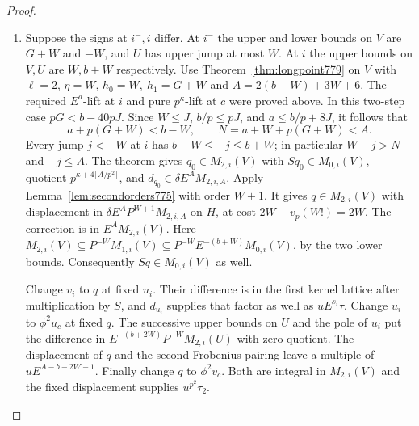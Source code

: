 \documentclass[a4paper,11pt]{article}
\theoremstyle{definition}
\theoremstyle{remark}
\numberwithin{equation}{section}
\begin{document}
\begin{proof}
\begin{enumerate}
First change \(u_i\) to \(q\) at fixed \(v_i\). The two
points are in \(S^{-1}M_{0,i}(U)\), and the first pairing
leaves a multiple of \(uE^{D-W-s_i}\). At fixed \(q\)
change \(v_i\) to \(\phi^2 v_c\). The difference is in
\(E^{-2W}P^{-W}M_{2,i}(V)\) with zero quotient, by
\(v_i\in E^{-W}M_{0,i}(V)\) and the second height inclusion.
The pairing with \(d_q\) costs \(\tau_2\) and leaves a
multiple of \(u E^{T-2W-1}P^{T-W-1}\). Finally change
\(q\) to \(\phi^2u_c\) at fixed \(\phi^2v_c\). Both
moving points are integral in \(M_{2,i}(U)\), and the
fixed displacement supplies \(u^{p^2}\tau_2\).

\item Suppose the signs at \(i^-,i\) differ. At \(i^-\)
the upper and lower bounds on \(V\) are \(G+W\) and
\(-W\), and \(U\) has upper jump at most \(W\).
At \(i\) the upper bounds on \(V,U\) are \(W,b+W\)
respectively. Use Theorem~\ref{thm:longpoint779} on \(V\)
with \(\ell=2\), \(\eta=W\), \(h_0=W,\ h_1=G+W\) and
\(A=2(b+W)+3W+6\). The required \(E^a\)-lift at \(i\)
and pure \(p^\kappa\)-lift at \(c\) were proved above.
In this two-step case \(pG<b-40pJ\). Since \(W\le J\),
\(b/p\le pJ\), and \(a\le b/p+8J\), it follows that
\[
          a+p(G+W)<b-W,\qquad N=a+W+p(G+W)<A .
\]
Every jump \(j<-W\) at \(i\) has \(b-W\le -j\le b+W\);
in particular \(W-j>N\) and \(-j\le A\). The theorem
gives \(q_0\in M_{2,i}(V)\) with \(Sq_0\in M_{0,i}(V)\),
quotient \(p^{\kappa+4\lceil A/p^2\rceil}\), and
\(d_{q_0}\in\delta E^A M_{2,i,A}\). Apply
Lemma~\ref{lem:secondorders775} with order \(W+1\).
It gives \(q\in M_{2,i}(V)\) with displacement in
\(\delta E^A P^{W+1}M_{2,i,A}\) on \(H\), at cost
\(2W+v_p(W!)=2W\). The correction is in \(E^A M_{2,i}(V)\).
Here \(M_{2,i}(V)\subseteq P^{-W}M_{1,i}(V)\subseteq
P^{-W}E^{-(b+W)}M_{0,i}(V)\), by the two lower bounds.
Consequently \(Sq\in M_{0,i}(V)\) as well.

Change \(v_i\) to \(q\) at fixed \(u_i\). Their difference
is in the first kernel lattice after multiplication by
\(S\), and \(d_{u_i}\) supplies that factor as well as
\(u E^{s_i}\tau\). Change \(u_i\) to \(\phi^2u_c\) at fixed
\(q\). The successive upper bounds on \(U\) and the pole of
\(u_i\) put the difference in \(E^{-(b+2W)}P^{-W}M_{2,i}(U)\)
with zero quotient. The displacement of \(q\) and the
second Frobenius pairing leave a multiple of
\(uE^{A-b-2W-1}\). Finally change \(q\) to \(\phi^2v_c\).
Both are integral in \(M_{2,i}(V)\) and the fixed
displacement supplies \(u^{p^2}\tau_2\).
\end{enumerate}


\end{proof}
\end{document}
